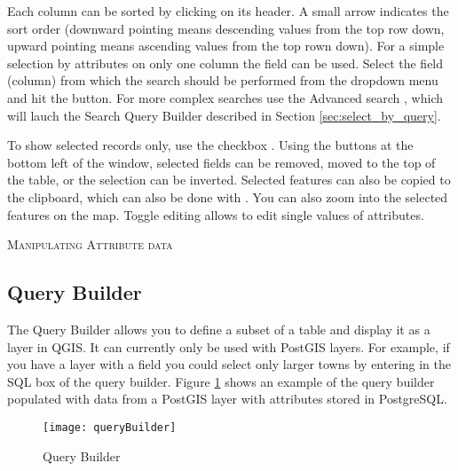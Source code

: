 Each column can be sorted by clicking on its header. A small arrow indicates the sort 
order (downward pointing means descending values from the top row down, upward pointing means 
ascending values from the top rown down). 
For a simple selection by attributes on only one column the  field 
can be used. Select the field (column) from which the search should be performed from 
the dropdown menu and hit the  button. For more complex searches use the
Advanced search , which will lauch the Search Query Builder described in 
Section \ref{sec:select_by_query}. 

To show selected records only, use the checkbox .
Using the buttons at the bottom left of the window, selected fields can be removed, 
moved to the top of the table, or the selection can be inverted. Selected features can 
also be copied to the clipboard, which can also be done with . You can also zoom 
into the selected features on the map. Toggle editing allows to edit single values of attributes. 

\begin{Tip}[ht]\caption{\textsc{Manipulating Attribute data}}
\end{Tip}


\subsection{Query Builder}\label{sec:query_builder}

The Query Builder allows you to define a subset of a table and display
it as a layer in QGIS. It can currently only be used with PostGIS layers. 
For example, if you have a  layer with a
 field you could select only larger towns by entering
 in the SQL box of the query builder. Figure
\ref{fig:query_builder} shows an example of the query builder populated with
data from a PostGIS layer with attributes stored in PostgreSQL. 

\begin{figure}[ht]
  \begin{center}
    \caption{Query Builder \nixcaption}\label{fig:query_builder}\smallskip
    \texttt{[image: queryBuilder]}
  \end{center}  
\end{figure}

